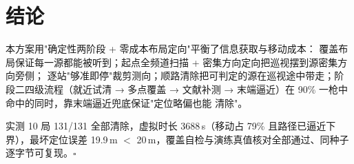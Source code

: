 \documentclass[a4paper,11pt]{ctexart}
\begin{document}
\section{结论}
本方案用"确定性两阶段 + 零成本布局定向"平衡了信息获取与移动成本：
覆盖布局保证每一源都能被听到；起点全频道扫描 + 密集方向定向把巡视摆到源密集方向旁侧；
逐站"够准即停"裁剪测向；顺路清除把可判定的源在巡视途中带走；阶段二四级流程（就近试清 → 
多点覆盖 → 文献补测 → 末端逼近）在 90\% 一枪中命中的同时，靠末端逼近兜底保证"定位略偏也能
清除"。

实测 10 局 131/131 全部清除，虚拟时长 3688\,s（移动占 79\% 且路径已逼近下界），最坏定位误差
19.9\,m $<$ 20\,m，覆盖自检与演练真值核对全部通过、同种子逐字节可复现。$\square$
\end{document}
